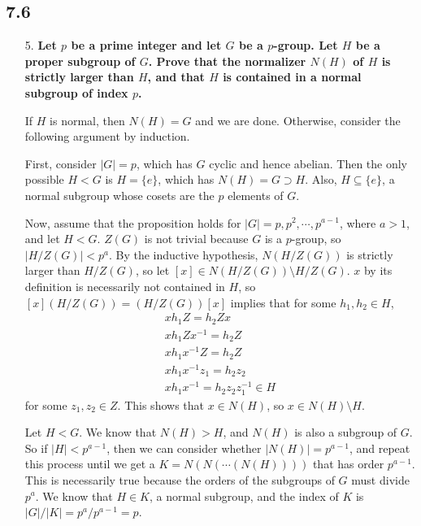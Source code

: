 \documentclass[a4paper,12pt]{article}
\begin{document}
\subsection*{7.6}
\begin{enumerate}
    \item[5.]
        \boldmath
        \textbf{Let $p$ be a prime integer and let $G$ be a $p$-group. Let $H$ be a proper subgroup of $G$. Prove that the normalizer $N(H)$ of $H$ is strictly larger than $H$, and that $H$ is contained in a normal subgroup of index $p$.} \par
        \unboldmath
        If $H$ is normal, then $N(H) = G$ and we are done. Otherwise, consider the following argument by induction. \par
        First, consider $|G| = p$, which has $G$ cyclic and hence abelian. Then the only possible $H < G$ is $H = \{ e \}$, which has $N(H) = G \supset H$. Also, $H \subseteq \{ e \}$, a normal subgroup whose cosets are the $p$ elements of $G$. \par
        Now, assume that the proposition holds for $|G| = p, p^2, \cdots, p^{a - 1}$, where $a > 1$, and let $H < G$. $Z(G)$ is not trivial because $G$ is a $p$-group, so $|H/Z(G)| < p^a$. By the inductive hypothesis, $N(H/Z(G))$ is strictly larger than $H/Z(G)$, so let $[x] \in N(H/Z(G)) \setminus H/Z(G)$. $x$ by its definition is necessarily not contained in $H$, so $[x](H/Z(G)) = (H/Z(G))[x]$ implies that for some $h_1, h_2 \in H$,
        \begin{gather*}
            xh_1 Z = h_2 Zx \\
            xh_1 Zx^{-1} = h_2 Z \\
            xh_1x^{-1} Z = h_2 Z \\
            xh_1 x^{-1} z_1 = h_2 z_2 \\
            xh_1 x^{-1} = h_2 z_2 z_1^{-1} \in H
        \end{gather*}
        for some $z_1, z_2 \in Z$. This shows that $x \in N(H)$, so $x \in N(H) \setminus H$. \par
        Let $H < G$. We know that $N(H) > H$, and $N(H)$ is also a subgroup of $G$. So if $|H| < p^{a - 1}$, then we can consider whether $|N(H)| = p^{a - 1}$, and repeat this process until we get a $K = N(N(\cdots(N(H))))$ that has order $p^{a - 1}$. This is necessarily true because the orders of the subgroups of $G$ must divide $p^a$. We know that $H \in K$, a normal subgroup, and the index of $K$ is $|G|/|K| = p^a / p^{a - 1} = p$.
\end{enumerate}
\end{document}
